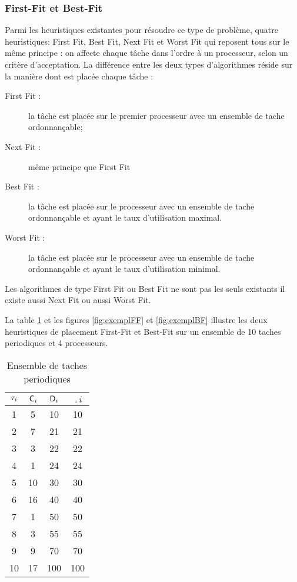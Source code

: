 \subsubsection{First-Fit et Best-Fit}
Parmi les heuristiques existantes pour résoudre ce type de problème,
 quatre heuristiques: First Fit, Best Fit, Next Fit et Worst
Fit qui reposent tous sur le même principe : on affecte chaque tâche
dans l'ordre à un processeur, selon un critère d'acceptation. La
différence entre les deux types d'algorithmes réside sur la manière
dont est placée chaque tâche :
\begin{description}
\item[First Fit :] la tâche est placée sur le premier processeur avec
  un ensemble de tache ordonnançable; 
\item[Next Fit :] même principe que First Fit 
\item[Best Fit :] la tâche est placée sur le processeur avec un
  ensemble de tache ordonnançable et ayant le taux d'utilisation
  maximal.
\item[Worst Fit :] la tâche est placée sur le processeur avec un
  ensemble de tache ordonnançable et ayant le taux d'utilisation
  minimal.
\end{description}

Les algorithmes de type First Fit ou Best Fit ne sont pas les seuls
existants il existe aussi Next Fit ou aussi Worst Fit.

La table \ref{tab:exampleFFBF} et les figures \ref{fig:exemplFF} et
\ref{fig:exemplBF} illustre les deux heuristiques de placement
First-Fit et Best-Fit sur un ensemble de 10 taches periodiques et 4
processeurs.

\begin{table}[!h]
\begin{center}
\begin{tabular}{|c|c|c|c|}
 \hline$\tau_{i}$ & $\mathsf{C}_{i}$ & $\mathsf{D}_{i}$ & $\period{i}$ \\ 
 \hline1 & 5 & 10 & 10 \\ 
 \hline 2 & 7 & 21 & 21 \\ 
 \hline 3 & 3 & 22 & 22 \\ 
 \hline 4 & 1 & 24 & 24 \\ 
 \hline 5 & 10 & 30 & 30 \\ 
 \hline 6 & 16 & 40 & 40 \\ 
 \hline 7 & 1 & 50 & 50 \\ 
 \hline 8 & 3 & 55 & 55 \\ 
 \hline 9 & 9 & 70 & 70 \\ 
 \hline 10 & 17 & 100 & 100 \\ 
 \hline 
 \end{tabular}
\end{center}
\caption{Ensemble de taches periodiques} \label{tab:exampleFFBF}
\end{table}

